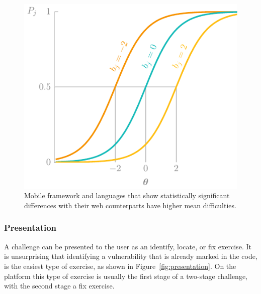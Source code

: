 \begin{figure}
    \centering
    \includegraphics[page=11]{03-education/figures/tikzfigures.pdf}
    \caption[Mobile versus web frameworks]{Mobile framework and languages that show statistically significant differences with their web counterparts have higher mean difficulties.}
    \label{fig:frames3}
\end{figure}

\subsubsection{Presentation}
A challenge can be presented to the user as an identify, locate, or fix exercise.
It is unsurprising that identifying a vulnerability that is already marked in the code, is the easiest type of exercise, as shown in Figure~\ref{fig:presentation}. 
On the platform this type of exercise is usually the first stage of a two-stage challenge, with the second stage a fix exercise.

